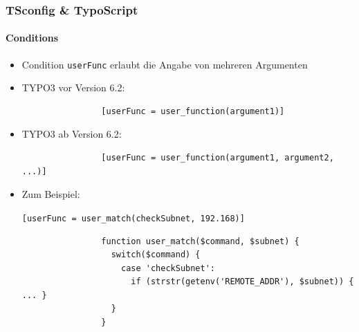 
\begin{frame}[fragile]
	\frametitle{TSconfig \& TypoScript}
	\framesubtitle{Conditions}

	\begin{itemize}
		\item Condition \texttt{userFunc} erlaubt die Angabe von mehreren Argumenten

		\item TYPO3 vor Version 6.2:
			\begin{lstlisting}
				[userFunc = user_function(argument1)]
			\end{lstlisting}

		\item TYPO3 ab Version 6.2:
			\begin{lstlisting}
				[userFunc = user_function(argument1, argument2, ...)]
			\end{lstlisting}

		\item Zum Beispiel:

			\lstinline![userFunc = user_match(checkSubnet, 192.168)]!

			\begin{lstlisting}
				function user_match($command, $subnet) {
				  switch($command) {
				    case 'checkSubnet':
				      if (strstr(getenv('REMOTE_ADDR'), $subnet)) { ... }
				  }
				}
			\end{lstlisting}

	\end{itemize}

\end{frame}


